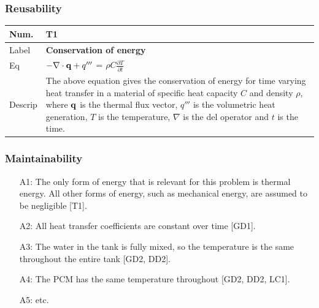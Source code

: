 \documentclass{beamer}
\newcommand{\colAwidth}{0.1\textwidth}
\newcommand{\colBwidth}{0.8\textwidth}
\begin{document}
\begin{frame}

\frametitle{Reusability}

\noindent
\begin{minipage}{\columnwidth}
\begin{tabular}{@{} p{\colAwidth}  p{\colBwidth}@{}}
\toprule
\textbf{Num.}& \textbf{T1} \\
\midrule
Label &\bf Conservation of energy\\
\midrule
Eq &  $-{\bf \nabla \cdot q} +q'''$ = $\rho C \frac{\partial T}{\partial t}$ \smallskip\\
\midrule
Descrip & The above equation gives the conservation of energy for time 
varying heat transfer in a material of specific heat capacity $C$ and density $\rho$,
where $\bf q$ is the thermal flux vector, $q'''$ is the volumetric heat
generation, $T$ is the temperature, $\nabla$ is the del operator and $t$ is the time.\\
\bottomrule
\end{tabular}
\end{minipage}

\end{frame}


\begin{frame}

\frametitle{Maintainability}

\begin{itemize}

\item[A1:] The
  only form of energy that is relevant for this problem is thermal energy.  All
  other forms of energy, such as mechanical energy, are assumed to be
  negligible [T1].

\item[A2:] All heat transfer coefficients are constant over time [GD1].

\item[A3:] The water in
  the tank is fully mixed, so the temperature is the same throughout the entire
  tank [GD2, DD2].

\item[A4:] The PCM has the same temperature throughout [GD2, DD2, LC1].

\item[A5:] etc.

\end{itemize}

\end{frame}
\end{document}
